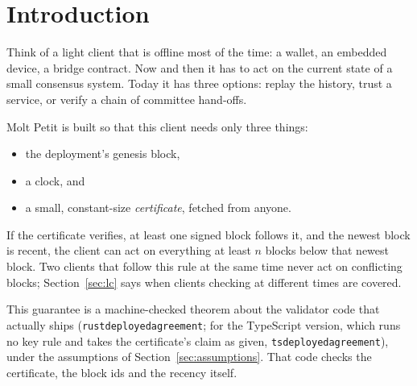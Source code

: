 \documentclass[10pt]{article}
\DeclareRobustCommand{\code}[1]{{\renewcommand{\_}{\textunderscore\allowbreak}\texttt{#1}}}
\begin{document}
\section{Introduction}
\label{sec:intro}

Think of a light client that is offline most of the time: a wallet, an
embedded device, a bridge contract. Now and then it has to act on the
current state of a small consensus system. Today it has three options:
replay the history, trust a service, or verify a chain of committee
hand-offs.

Molt Petit is built so that this client needs only three things:
\begin{itemize}
\item the deployment's genesis block,
\item a clock, and
\item a small, constant-size \emph{certificate}, fetched from anyone.
\end{itemize}
If the certificate verifies, at least one signed block follows it, and
the newest block is recent, the client can act on everything at least
$n$ blocks below that newest block. Two clients that follow this rule at
the same time never act on conflicting blocks; Section~\ref{sec:lc}
says when clients checking at different times are covered.

This guarantee is a machine-checked theorem about the validator code that
actually ships (\code{rust\_deployed\_agreement}; for the TypeScript
version, which runs no key rule and takes the certificate's claim as
given, \code{ts\_deployed\_agreement}), under the
assumptions of Section~\ref{sec:assumptions}. That code checks the
certificate, the block ids and the recency itself.
\end{document}
